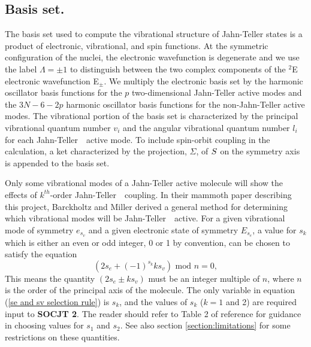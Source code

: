 \documentclass{article}
\newcommand{\JT}{Jahn-Teller\ }
\newcommand{\socjttwo}{{\bf SOCJT 2}}
\begin{document}
\subsection{Basis set.} The basis set used to compute the vibrational 
structure of Jahn-Teller states is a product of electronic, vibrational,
and spin functions. At the symmetric configuration of the nuclei, 
the electronic wavefunction is degenerate and we use the label
$\Lambda = \pm 1$ to distinguish between the 
two complex components of the $^2$E electronic wavefunction E$_\pm$. 
We multiply the electronic basis set by the harmonic oscillator basis
functions for the $p$ two-dimensional Jahn-Teller active modes and the
$3N-6-2p$ harmonic oscillator basis functions for the non-Jahn-Teller
active modes. The vibrational portion of the basis set is
characterized by the principal vibrational quantum number $v_i$ and
the angular vibrational quantum number $l_i$ for each \JT\ active mode.
To include spin-orbit coupling in the calculation,
a ket characterized by the projection, $\Sigma $, of ${\bf S}$ on the 
symmetry axis is appended to the basis set.

Only some vibrational modes of a Jahn-Teller active molecule will show
the effects of $k^{th}$-order \JT\ coupling. In their mammoth paper
describing this 
project, Barckholtz and Miller derived a general method for determining which vibrational
modes will be \JT\ active. For a given vibrational mode of symmetry
$e_{s_v}$ and  a given electronic state of symmetry $E_{s_e}$, a value
for $s_k$ which is either an even or odd integer,
0 or 1 by convention, can be chosen to satisfy the equation
\begin{equation}
\left( 2s_e + (-1)^{s_k } ks_v \right) \text{ mod } n=0,
\label{se and sv selection rule}
\end{equation}
This means the quantity $\left( 2s_e \pm ks_v \right) $
must be an integer multiple of $n$, where $n$ is the order of the
principal axis of the molecule. The only variable in equation (\ref{se
  and sv selection rule}) is $s_k$, and the values of $s_k$ ($k=1$ and 2)
are required input to \socjttwo. The reader should refer to Table 2 of
reference  for guidance in choosing values for $s_1$ and
$s_2$. See also section \ref{section:limitations} for some
restrictions on these quantities.
\end{document}
